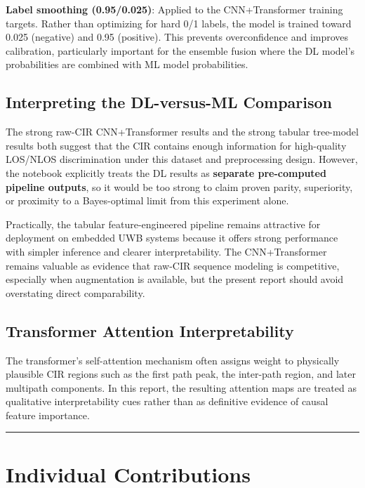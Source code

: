 \documentclass[12pt,a4paper]{article}
\begin{document}
\textbf{Label smoothing (0.95/0.025)}: Applied to the CNN+Transformer
training targets. Rather than optimizing for hard 0/1 labels, the model
is trained toward 0.025 (negative) and 0.95 (positive). This prevents
overconfidence and improves calibration, particularly important for the
ensemble fusion where the DL model's probabilities are combined with ML
model probabilities.

\subsection{Interpreting the DL-versus-ML
Comparison}\label{interpreting-the-dl-versus-ml-comparison}

The strong raw-CIR CNN+Transformer results and the strong tabular
tree-model results both suggest that the CIR contains enough information
for high-quality LOS/NLOS discrimination under this dataset and
preprocessing design. However, the notebook explicitly treats the DL
results as \textbf{separate pre-computed pipeline outputs}, so it would
be too strong to claim proven parity, superiority, or proximity to a
Bayes-optimal limit from this experiment alone.

Practically, the tabular feature-engineered pipeline remains attractive
for deployment on embedded UWB systems because it offers strong
performance with simpler inference and clearer interpretability. The
CNN+Transformer remains valuable as evidence that raw-CIR sequence
modeling is competitive, especially when augmentation is available, but
the present report should avoid overstating direct comparability.

\subsection{Transformer Attention
Interpretability}\label{transformer-attention-interpretability}

The transformer's self-attention mechanism often assigns weight to
physically plausible CIR regions such as the first path peak, the
inter-path region, and later multipath components. In this report, the
resulting attention maps are treated as qualitative interpretability
cues rather than as definitive evidence of causal feature importance.

\begin{center}\rule{0.5\linewidth}{0.5pt}\end{center}

\section{Individual Contributions}\label{individual-contributions}
\end{document}
